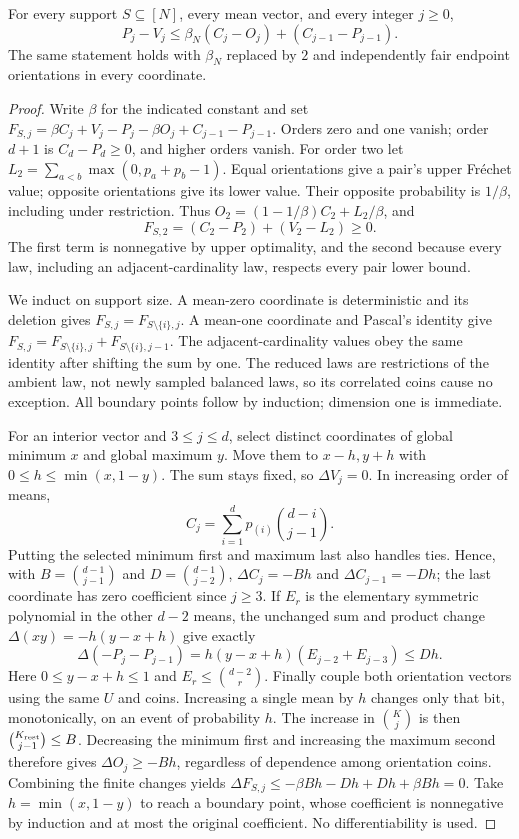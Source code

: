 \begin{lemma}\label{lem:box-coefficient}
For every support $S\subseteq[N]$, every mean vector, and every integer
$j\ge0$,
\begin{equation}\label{eq:box-coefficient}
 P_j-V_j\le\beta_N(C_j-O_j)+(C_{j-1}-P_{j-1}).
\end{equation}
The same statement holds with $\beta_N$ replaced by $2$ and independently
fair endpoint orientations in every coordinate.
\end{lemma}
\begin{proof}
Write $\beta$ for the indicated constant and set
$F_{S,j}=\beta C_j+V_j-P_j-\beta O_j+C_{j-1}-P_{j-1}$.
Orders zero and one vanish; order $d+1$ is $C_d-P_d\ge0$, and higher
orders vanish. For order two let
$L_2=\sum_{a<b}\max(0,p_a+p_b-1)$. Equal orientations give a pair's
upper Fr\'echet value; opposite orientations give its lower value.
Their opposite probability is $1/\beta$, including under restriction.
Thus $O_2=(1-1/\beta)C_2+L_2/\beta$, and
\[
 F_{S,2}=(C_2-P_2)+(V_2-L_2)\ge0.
\]
The first term is nonnegative by upper optimality, and the second
because every law, including an adjacent-cardinality law, respects every
pair lower bound.

We induct on support size. A mean-zero coordinate is deterministic and
its deletion gives $F_{S,j}=F_{S\setminus\{i\},j}$.
A mean-one coordinate and Pascal's identity give
$F_{S,j}=F_{S\setminus\{i\},j}+F_{S\setminus\{i\},j-1}$.
The adjacent-cardinality values obey the same identity after shifting
the sum by one. The reduced laws are restrictions of the ambient law, not
newly sampled balanced laws, so its correlated coins cause no exception.
All boundary points follow by induction; dimension one is immediate.

For an interior vector and $3\le j\le d$, select distinct coordinates
of global minimum $x$ and global maximum $y$. Move them to $x-h,y+h$
with $0\le h\le\min(x,1-y)$. The sum stays fixed, so $\Delta V_j=0$.
In increasing order of means,
\[
 C_j=\sum_{i=1}^d p_{(i)}\binom{d-i}{j-1}.
\]
Putting the selected minimum first and maximum last also handles ties.
Hence, with $B=\binom{d-1}{j-1}$ and $D=\binom{d-1}{j-2}$,
$\Delta C_j=-Bh$ and $\Delta C_{j-1}=-Dh$; the last coordinate has
zero coefficient since $j\ge3$. If $E_r$ is the elementary symmetric
polynomial in the other $d-2$ means, the unchanged sum and product
change $\Delta(xy)=-h(y-x+h)$ give exactly
\[
 \Delta(-P_j-P_{j-1})
 =h(y-x+h)(E_{j-2}+E_{j-3})\le Dh.
\]
Here $0\le y-x+h\le1$ and $E_r\le\binom{d-2}{r}$.
Finally couple both orientation vectors using the same $U$ and coins.
Increasing a single mean by $h$ changes only that bit, monotonically,
on an event of probability $h$. The increase in $\binom Kj$ is then
$\binom{K_{\rm rest}}{j-1}\le B$. Decreasing the minimum first and
increasing the maximum second therefore gives $\Delta O_j\ge-Bh$,
regardless of dependence among orientation coins. Combining the finite
changes yields $\Delta F_{S,j}\le-\beta Bh-Dh+Dh+\beta Bh=0$.
Take $h=\min(x,1-y)$ to reach a boundary point, whose coefficient is
nonnegative by induction and at most the original coefficient. No
differentiability is used.
\end{proof}

